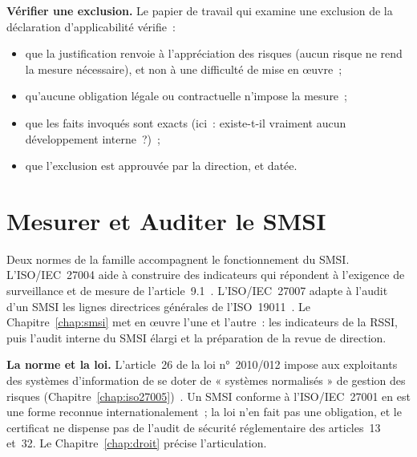 \begin{boxprocedure}
\textbf{Vérifier une exclusion.} Le papier de travail qui examine une
exclusion de la déclaration d'applicabilité vérifie~:
\begin{itemize}
    \item que la justification renvoie à l'appréciation des risques (aucun
          risque ne rend la mesure nécessaire), et non à une difficulté de
          mise en œuvre~;
    \item qu'aucune obligation légale ou contractuelle n'impose la
          mesure~;
    \item que les faits invoqués sont exacts (ici~: existe-t-il vraiment
          aucun développement interne~?)~;
    \item que l'exclusion est approuvée par la direction, et datée.
\end{itemize}
\end{boxprocedure}

\section{Mesurer et Auditer le SMSI}
\label{sec:c08-autres}

Deux normes de la famille accompagnent le fonctionnement du SMSI.
L'ISO/IEC~27004 aide à construire des indicateurs qui répondent à
l'exigence de surveillance et de mesure de l'article~9.1~\cite{iso27004_2016}.
L'ISO/IEC~27007 adapte à l'audit d'un SMSI les lignes directrices générales
de l'ISO~19011~\cite{iso27007_2020}. Le Chapitre~\ref{chap:smsi} met en
œuvre l'une et l'autre~: les indicateurs de la RSSI, puis l'audit interne du
SMSI élargi et la préparation de la revue de direction.

\begin{boxinfo}
\textbf{La norme et la loi.} L'article~26 de la loi n°~2010/012 impose aux
exploitants des systèmes d'information de se doter de « systèmes
normalisés » de gestion des risques (Chapitre~\ref{chap:iso27005})~\cite{loi2010012}.
Un SMSI conforme à l'ISO/IEC~27001 en est une forme reconnue
internationalement~; la loi n'en fait pas une obligation, et le certificat
ne dispense pas de l'audit de sécurité réglementaire des articles~13 et~32.
Le Chapitre~\ref{chap:droit} précise l'articulation.
\end{boxinfo}

